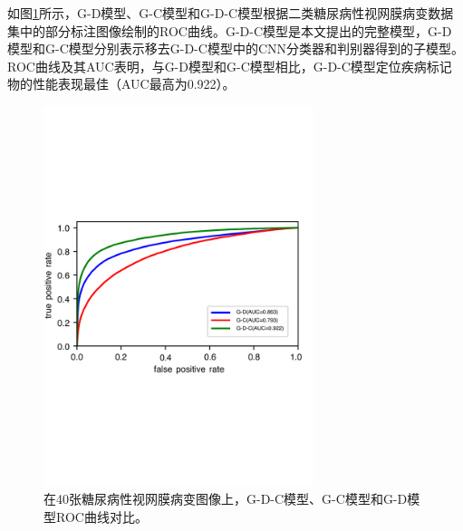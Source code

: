 如图\ref{fig:roc_u_d_u_c_u_d_c_components}所示，G-D模型、G-C模型和G-D-C模型根据二类糖尿病性视网膜病变数据集中的部分标注图像绘制的ROC曲线。G-D-C模型是本文提出的完整模型，G-D模型和G-C模型分别表示移去G-D-C模型中的CNN分类器和判别器得到的子模型。ROC曲线及其AUC表明，与G-D模型和G-C模型相比，G-D-C模型定位疾病标记物的性能表现最佳（AUC最高为0.922）。
\begin{figure}[H]
	\centering
	\includegraphics[width=0.7\textwidth]{figure/ROC_u_d_u_c_u_d_c_components.pdf}
	\caption[G-D-C模型、G-C模型和G-D模型ROC曲线对比]{在40张糖尿病性视网膜病变图像上，G-D-C模型、G-C模型和G-D模型ROC曲线对比。}
	\label{fig:roc_u_d_u_c_u_d_c_components}
\end{figure}
\endinput
